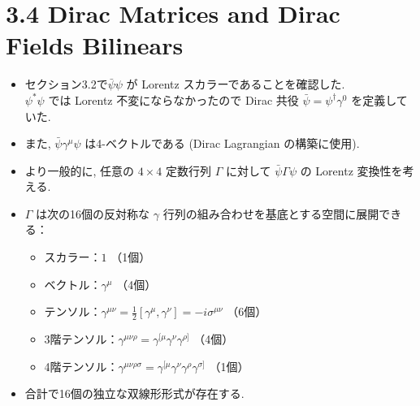 \documentclass[a4paper,12pt]{article}
\begin{document}
\section*{3.4 Dirac Matrices and Dirac Fields Bilinears}
\begin{itemize}
  \item セクション3.2で$\bar{\psi} \psi$ が Lorentz スカラーであることを確認した.\\
  \color{blue}
  $\psi^* \psi$ では Lorentz 不変にならなかったので Dirac 共役 $\bar{\psi} = \psi^{\dagger}\gamma^0$ を定義していた.
  \color{black}
  \item また, $\bar{\psi} \gamma^\mu \psi$ は4-ベクトルである (Dirac Lagrangian の構築に使用).
  \item より一般的に, 任意の $4 \times 4$ 定数行列 $\Gamma$ に対して $\bar{\psi} \Gamma \psi$ の Lorentz 変換性を考える.
  \item $\Gamma$ は次の16個の反対称な $\gamma$ 行列の組み合わせを基底とする空間に展開できる：
  \begin{itemize}
    \item スカラー：$1$ \hfill （1個）
    \item ベクトル：$\gamma^\mu$ \hfill （4個）
    \item テンソル：$\gamma^{\mu\nu} = \frac{1}{2}[\gamma^\mu, \gamma^\nu] = -i \sigma^{\mu\nu}$ \hfill （6個）
    \item 3階テンソル：$\gamma^{\mu\nu\rho} = \gamma^{[\mu} \gamma^\nu \gamma^{\rho]}$ \hfill （4個）
    \item 4階テンソル：$\gamma^{\mu\nu\rho\sigma} = \gamma^{[\mu} \gamma^\nu \gamma^\rho \gamma^{\sigma]}$ \hfill （1個）
  \end{itemize}
  \item 合計で16個の独立な双線形形式が存在する.


\end{itemize}
\end{document}
